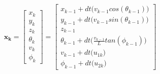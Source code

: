 \begin{align}
\boldsymbol{x_k} = 
\begin{bmatrix}
x_k  \\[10pt]
y_k  \\[10pt]
z_k \\[10pt]
\theta_k \\[10pt]
v_k  \\[10pt]
\phi_k
\end{bmatrix}
= 
\begin{bmatrix}
 x_{k-1} + dt \big(v_{k-1} cos(\theta_{k-1})\big) \\[10pt]
 y_{k-1} + dt \big(v_{k-1} sin(\theta_{k-1})\big) \\[10pt]
 z_{k-1} \\[10pt]
 \theta_{k-1} + dt\Big(\frac{v_{k-1}}{L}tan(\phi_{k-1}) \Big)\\[10pt]
v_{k-1} + dt \big(u_{1k}\big) \\[10pt]
\phi_{k-1} + dt \big(u_{2k}\big) 
\end{bmatrix}
\label{eq:equation_nonholonomic_discrete}
\end{align}

